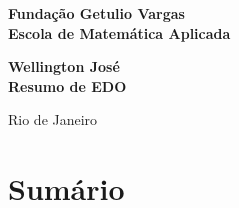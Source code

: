 \documentclass{article}
\begin{document}
\begin{titlepage}
\begin{center}
\textbf{\LARGE Fundação Getulio Vargas}\\ 
\textbf{\LARGE Escola de Matemática Aplicada}

\par
\vspace{170pt}
\textbf{\Large Wellington José}\\
\vspace{32pt}
\textbf{\Large Resumo de EDO}\\
\end{center}

\par
\vfill
\begin{center}
{{\normalsize Rio de Janeiro}\\
{\normalsize \the\year}}
\end{center}
\end{titlepage}

\section*{Sumário}

\hspace{5mm}\textbf{}
\vspace{4mm}

\textbf{}
\vspace{4mm}

\textbf{}
\vspace{4mm}

\textbf{}
\vspace{4mm}

\textbf{}
\vspace{4mm}

\textbf{}
\vspace{4mm}

\textbf{}
\vspace{4mm}

\textbf{}
\vspace{4mm}

\textbf{}
\vspace{4mm}

\textbf{}
\vspace{4mm}

\textbf{}
\vspace{4mm}

\textbf{}
\vspace{4mm}
\end{document}
